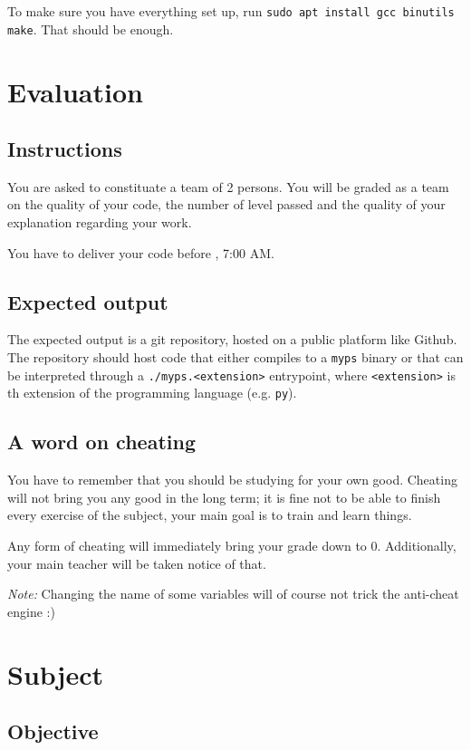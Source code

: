 \documentclass[12pt]{article}
\begin{document}
To make sure you have everything set up, run \texttt{sudo apt install gcc binutils make}. That should be enough.

\section{Evaluation}
\subsection{Instructions}

You are asked to constituate a team of 2 persons. You will be graded as a team on the quality of your code, the number of level passed and the quality of your explanation regarding your work.

You have to deliver your code before , 7:00 AM.

\subsection{Expected output}

The expected output is a git repository, hosted on a public platform like Github. The repository should host code that either compiles to a \texttt{myps} binary or that can be interpreted through a \texttt{./myps.<extension>} entrypoint, where \texttt{<extension>} is th extension of the programming language (e.g. \texttt{py}).

\subsection{A word on cheating}

You have to remember that you should be studying for your own good. Cheating will not bring you any good in the long term; it is fine not to be able to finish every exercise of the subject, your main goal is to train and learn things.

Any form of cheating will immediately bring your grade down to 0. Additionally, your main teacher will be taken notice of that.

\textit{Note:} Changing the name of some variables will of course not trick the anti-cheat engine :)

\section{Subject}

\subsection{Objective}
\end{document}
